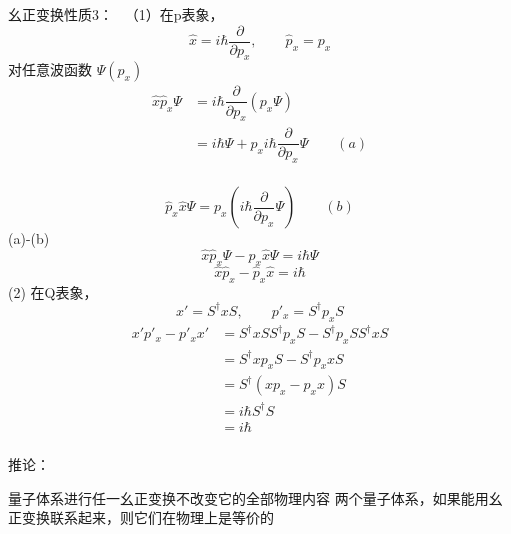 \begin{frame} {幺正变换性质3：}
    \例[7.幺正变换不改变物理规律，现已知在 x 表象中的基本对易关系$xp_x-p_x x =i\hbar$， 试求它在p表象中的形式，然后证明这种对易关系不随表象发生变化]{}
    \解 ~（1）在p表象， $$ \hat{x}=i\hbar\dfrac{\partial}{\partial p_x}, \qquad \hat{p}_x=p_x $$
     对任意波函数 $\Psi(p_x)$
    \begin{equation*}
        \begin{split}
            \hat{x}\hat{p}_x\Psi &= i\hbar\dfrac{\partial}{\partial p_x} (p_x \Psi )\\
            &= i\hbar\Psi + p_xi\hbar\dfrac{\partial}{\partial p_x}\Psi \qquad (a)\\
        \end{split} 
    \end{equation*} 

\end{frame}  
\begin{frame} 
    $$\hat{p}_x\hat{x}\Psi = p_x(i\hbar\dfrac{\partial}{\partial p_x}\Psi) \qquad (b)$$
    (a)-(b)
    $$\hat{x}\hat{p}_x\Psi-\hat{p}_x\hat{x}\Psi=i\hbar\Psi$$
    $$\hat{x}\hat{p}_x-\hat{p}_x\hat{x}=i\hbar$$
    (2) 在Q表象，$$ x'= S^\dagger x S, \qquad p'_x= S^\dagger p_x S $$
    \begin{equation*}
        \begin{split}
        x'p'_x-p'_x x' &= S^\dagger x S S^\dagger p_x S - S^\dagger p_x S S^\dagger x S \\
        &= S^\dagger x p_x S - S^\dagger p_x x S \\
        &= S^\dagger (x p_x -  p_x x) S \\
        &= i\hbar S^\dagger S \\
        &= i\hbar \\
        \end{split} 
    \end{equation*} 
\end{frame}  
\begin{frame}
    \begin{tcolorbox2}{推论：}
       \begin{enumerate}
           \Item 量子体系进行任一幺正变换不改变它的全部物理内容
           \Item 两个量子体系，如果能用幺正变换联系起来，则它们在物理上是等价的
       \end{enumerate} 
    \end{tcolorbox2}
\end{frame}

